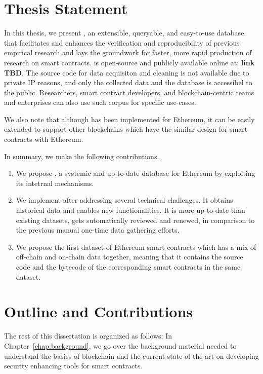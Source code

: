 \section{Thesis Statement}
  In this thesis, we present \mytool, an extensible, queryable, and easy-to-use database that facilitates and enhances the verification and reproducibility of previous empirical research and lays the groundwork for faster, more rapid production of research on smart contracts.
  \mytool is open-source and publicly available online at: \textbf{link TBD}.
  The source code for data acquisiton and cleaning is not available due to private IP reasons, and only the collected data and the database is accessibel to the public.
  Researchers, smart contract developers, and blockchain-centric teams and enterprises can also use such corpus for specific use-cases.

  We also note that although \mytool has been implemented for Ethereum, it can be easily extended to support other blockchains which have the similar design for smart contracts with Ethereum.

  In summary, we make the following contributions.
  \begin{enumerate}
    \item We propose \mytool, a systemic and up-to-date database for Ethereum by exploiting its intetrnal mechanisms.
    \item We implement \mytool after addressing several technical challenges. It obtains historical data and enables new functionalities. It is more up-to-date than existing datasets, gets sutomatically reviewed and renewed, in comparison to the previous manual one-time data gathering efforts.
    \item We propose the first dataset of Ethereum smart contracts which has a mix of off-chain and on-chain data together, meaning that it contains the source code and the bytecode of the corresponding smart contracts in the same dataset.
  \end{enumerate}


\section{Outline and Contributions}

  The rest of this dissertation is organized as follows:
  In Chapter~\ref{chap:background}, we go over the background material needed to understand the basics of blockchain and the current state of the art on developing security enhancing tools for smart contracts.

